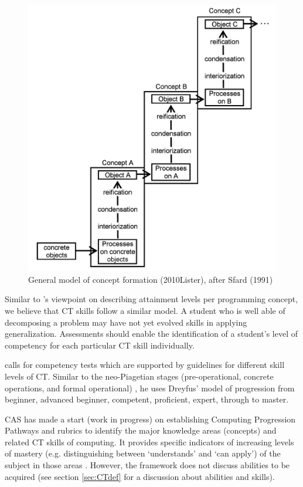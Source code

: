 \begin{figure}
\includegraphics[scale=0.8]{figures/ListerFases.png}
General model of concept formation (2010Lister), after Sfard (1991)\label{fig:ListerFases}
\end{figure}




Similar to 's viewpoint on describing attainment levels per programming concept, we believe that CT skills follow a similar model. A student who is well able of decomposing a problem may have not yet evolved skills in applying generalization. Assessments should enable the identification of a student's level of competency for each particular CT skill individually.


 calls for competency tests which are supported by guidelines for different skill levels of CT. Similar to the neo-Piagetian stages (pre-operational, concrete operations, and formal operational) \cite{szabo2014neo}, he uses Dreyfus' model of progression from beginner, advanced beginner, competent, proficient, expert, through to master.

CAS has made a start (work in progress) on establishing Computing Progression Pathways and rubrics \cite{Dorling2014CTprogressions} to identify the major knowledge areas (concepts) and related CT skills of computing. It provides specific indicators of increasing levels of mastery (e.g. distinguishing between ‘understands’ and ‘can apply’) of the subject in those areas \cite{Giordano2015}. However, the framework does not discuss abilities to be acquired \cite{denning2017remaining} (see section \ref{sec:CTdef} for a discussion about abilities and skills).






